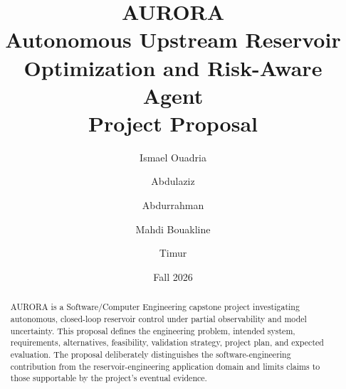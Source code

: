 \documentclass[11pt]{article}
\title{
  \textbf{AURORA}\\
  \large Autonomous Upstream Reservoir Optimization and Risk-Aware Agent\\
  \vspace{0.5em}
  \normalsize Project Proposal
}
\author{
  Ismael Ouadria \and
  Abdulaziz \and
  Abdurrahman \and
  Mahdi Bouakline \and
  Timur
}
\date{Fall 2026}
\begin{document}
\maketitle

\begin{abstract}
AURORA is a Software/Computer Engineering capstone project investigating autonomous,
closed-loop reservoir control under partial observability and model uncertainty.
This proposal defines the engineering problem, intended system, requirements,
alternatives, feasibility, validation strategy, project plan, and expected evaluation.
The proposal deliberately distinguishes the software-engineering contribution from
the reservoir-engineering application domain and limits claims to those supportable
by the project's eventual evidence.
\end{abstract}

\tableofcontents
\newpage























\end{document}
